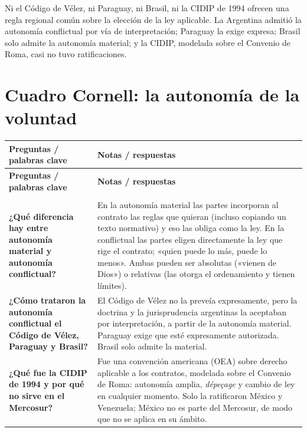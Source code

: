 \documentclass[12pt,oneside]{book}
\begin{document}
\begin{important}
Ni el Código de Vélez, ni Paraguay, ni Brasil, ni la CIDIP de 1994 ofrecen una regla regional común sobre la elección de la ley aplicable. La Argentina admitió la autonomía conflictual por vía de interpretación; Paraguay la exige expresa; Brasil solo admite la autonomía material; y la CIDIP, modelada sobre el Convenio de Roma, casi no tuvo ratificaciones.
\end{important}

\section{Cuadro Cornell: la autonomía de la voluntad}

\begin{longtable}{@{}
    >{\raggedright\arraybackslash}p{}
    >{\raggedright\arraybackslash}p{}@{}}
\toprule
\textbf{Preguntas / palabras clave} & \textbf{Notas / respuestas} \\
\midrule
\endfirsthead
\toprule
\textbf{Preguntas / palabras clave} & \textbf{Notas / respuestas} \\
\midrule
\endhead
\midrule
\multicolumn{2}{r}{\small\textit{continúa en la página siguiente}} \\
\endfoot
\bottomrule
\endlastfoot

\textbf{¿Qué diferencia hay entre autonomía material y autonomía conflictual?} &
En la autonomía material las partes incorporan al contrato las reglas que quieran (incluso copiando un texto normativo) y eso las obliga como la ley. En la conflictual las partes eligen directamente la ley que rige el contrato; «quien puede lo más, puede lo menos». Ambas pueden ser absolutas («vienen de Dios») o relativas (las otorga el ordenamiento y tienen límites). \\[0.6em]

\textbf{¿Cómo trataron la autonomía conflictual el Código de Vélez, Paraguay y Brasil?} &
El Código de Vélez no la preveía expresamente, pero la doctrina y la jurisprudencia argentinas la aceptaban por interpretación, a partir de la autonomía material. Paraguay exige que esté expresamente autorizada. Brasil solo admite la material. \\[0.6em]

\textbf{¿Qué fue la CIDIP de 1994 y por qué no sirve en el Mercosur?} &
Fue una convención americana (OEA) sobre derecho aplicable a los contratos, modelada sobre el Convenio de Roma: autonomía amplia, \textit{dépeçage} y cambio de ley en cualquier momento. Solo la ratificaron México y Venezuela; México no es parte del Mercosur, de modo que no se aplica en su ámbito. \\[0.6em]


\end{longtable}
\end{document}
